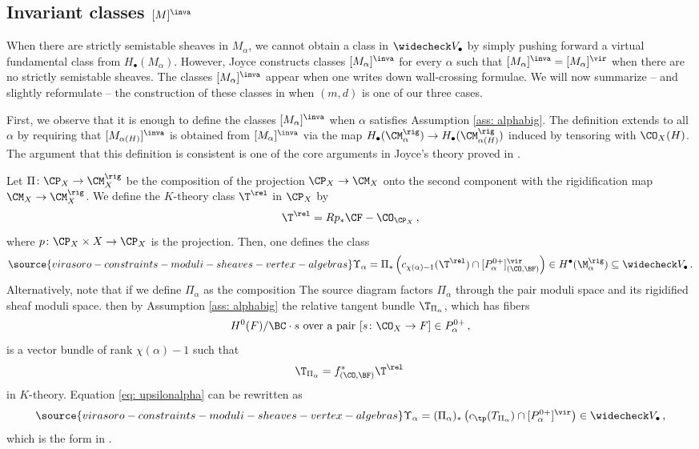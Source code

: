 \subsection{Invariant classes $[M]^\inva$}
\label{sec: joyceclasses}
When there are strictly semistable sheaves in $M_\alpha$, we cannot obtain a class in $\widecheck V_\bullet$ by simply pushing forward a virtual fundamental class from $H_\bullet(M_\alpha)$. However, Joyce constructs classes $[M_\alpha]^{\inva}$ for every $\alpha$ such that $[M_\alpha]^{\inva}=[M_\alpha]^\vir$ when there are no strictly semistable sheaves. The classes $[M_\alpha]^{\inva}$ appear when one writes down wall-crossing formulae. We will now summarize -- and slightly reformulate -- the construction of these classes in \cite[Theorem 5.7, Section 9]{Jo21} when $(m,d)$ is one of our three cases.


First, we observe that it is enough to define the classes $[M_\alpha]^{\inva}$ when $\alpha$ satisfies Assumption \ref{ass: alphabig}. The definition extends to all $\alpha$ by requiring that $[M_{\alpha(H)}]^\inva$ is obtained from $[M_{\alpha}]^\inva$ via the map $H_\bullet(\CM_\alpha^\rig)\to H_\bullet(\CM_{\alpha(H)}^\rig)$ induced by tensoring with $\CO_X(H)$. The argument that this definition is consistent is one of the core arguments in Joyce's theory proved in \cite[Proposition 9.12]{Jo21}.

Let $\Pi\colon \CP_X\to \CM_X^\rig$ be the composition of the projection $\CP_X\to \CM_X$ onto the second component with the rigidification map $\CM_X\to \CM_X^\rig$. We define the $K$-theory class $\T^{\rel}$ in $\CP_X$ by
\[\T^{\rel}=Rp_\ast \CF-\CO_{\CP_X}\,,\]
where $p\colon \CP_X\times X\to \CP_X$ is the projection. Then, one defines the class
\begin{equation}\label{eq: upsilonalpha}
\source{virasoro-constraints-moduli-sheaves-vertex-algebras}
\Upsilon_\alpha=\Pi_\ast\left( c_{\chi(\alpha)-1}(\T^{\rel})\cap [P_\alpha^{0+}]^\vir_{(\CO,\BF)} \right)\in H^\bullet(\M_\alpha^\rig)\subseteq \widecheck V_\bullet\,.
\end{equation}
Alternatively, note that if we define $\Pi_\alpha$ as the composition
The source diagram factors $\Pi_\alpha$ through the pair moduli space and its
rigidified sheaf moduli space.
then by Assumption \ref{ass: alphabig} the relative tangent bundle $\T_{\Pi_\alpha}$, which has fibers
\[H^0(F)/\BC\cdot s\textup{ over a pair }[s\colon \CO_X\to F]\in P_\alpha^{0+}\,,\] is a vector bundle of rank $\chi(\alpha)-1$ such that \[\T_{\Pi_\alpha}=f_{(\CO,\BF)}^\ast \T^{\rel}\,\]
in $K$-theory. Equation \eqref{eq: upsilonalpha} can be rewritten as
\begin{equation}\label{eq: upsilonalpha2}
\source{virasoro-constraints-moduli-sheaves-vertex-algebras}
\Upsilon_\alpha=(\Pi_\alpha)_\ast\left( c_{\tp}(T_{\Pi_\alpha})\cap [P_\alpha^{0+}]^\vir \right)\in \widecheck V_\bullet\,,
\end{equation}
which is the form in \cite[(5.29)]{Jo21}.

